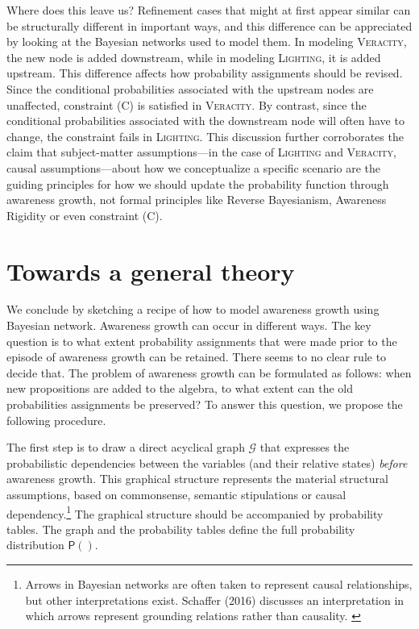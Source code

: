\documentclass[
  11pt,
  dvipsnames,enabledeprecatedfontcommands]{scrartcl}
\newcommand{\pr}[1]{\ensuremath{\mathsf{P}(#1)}}
\begin{document}
Where does this leave us? Refinement cases that might at first appear
similar can be structurally different in important ways, and this
difference can be appreciated by looking at the Bayesian networks used
to model them. In modeling \textsc{Veracity}, the new node is added
downstream, while in modeling \textsc{Lighting}, it is added upstream.
This difference affects how probability assignments should be revised.
Since the conditional probabilities associated with the upstream nodes
are unaffected, constraint (C) is satisfied in \textsc{Veracity}. By
contrast, since the conditional probabilities associated with the
downstream node will often have to change, the constraint fails in
\textsc{Lighting}. This discussion further corroborates the claim that
subject-matter assumptions---in the case of \textsc{Lighting} and
\textsc{Veracity}, causal assumptions---about how we conceptualize a
specific scenario are the guiding principles for how we should update
the probability function through awareness growth, not formal principles
like Reverse Bayesianism, Awareness Rigidity or even constraint (C).

\hypertarget{towards-a-general-theory}{%
\section{Towards a general theory}\label{towards-a-general-theory}}

\label{sec:general}

We conclude by sketching a recipe of how to model awareness growth using
Bayesian network. Awareness growth can occur in different ways. The key
question is to what extent probability assignments that were made prior
to the episode of awareness growth can be retained. There seems to no
clear rule to decide that. The problem of awareness growth can be
formulated as follows: when new propositions are added to the algebra,
to what extent can the old probabilities assignments be preserved? To
answer this question, we propose the following procedure.

The first step is to draw a direct acyclical graph \(\mathcal{G}\) that
expresses the probabilistic dependencies between the variables (and
their relative states) \textit{before} awareness growth. This graphical
structure represents the material structural assumptions, based on
commonsense, semantic stipulations or causal dependency.\footnote{Arrows
  in Bayesian networks are often taken to represent causal
  relationships, but other interpretations exist. Schaffer (2016)
  discusses an interpretation in which arrows represent grounding
  relations rather than causality. \label{footnote:causation}} The
graphical structure should be accompanied by probability tables. The
graph and the probability tables define the full probability
distribution \(\pr{}\).
\end{document}
